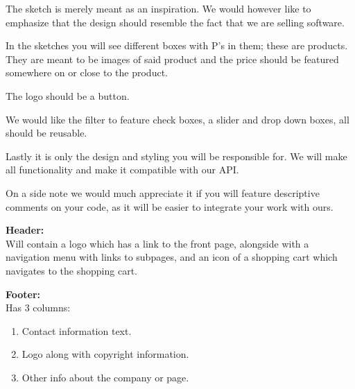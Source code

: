 \documentclass[11pt]{report}
\begin{document}
\noindent The sketch is merely meant as an inspiration. We would however like to emphasize that the design should resemble the fact that we are selling software.

\noindent In the sketches you will see different boxes with P’s in them; these are products. They are meant to be images of said product and the price should be featured somewhere on or close to the product.

\noindent The logo should be a button.

\noindent We would like the filter to feature check boxes, a slider and drop down boxes, all should be reusable.

\noindent Lastly it is only the design and styling you will be responsible for. We will make all functionality and make it compatible with our API.

\noindent On a side note we would much appreciate it if you will feature descriptive comments on your code, as it will be easier to integrate your work with ours.

\noindent \textbf{Header:}\\
\noindent Will contain a logo which has a link to the front page, alongside with a navigation menu with links to subpages, and an icon of a shopping cart which navigates to the shopping cart. 

\noindent \textbf{Footer:}\\
\noindent Has 3 columns:
\begin{enumerate}
  \item Contact information text.
  \item Logo along with copyright information.
  \item Other info about the company or page.
\end{enumerate}
\end{document}
